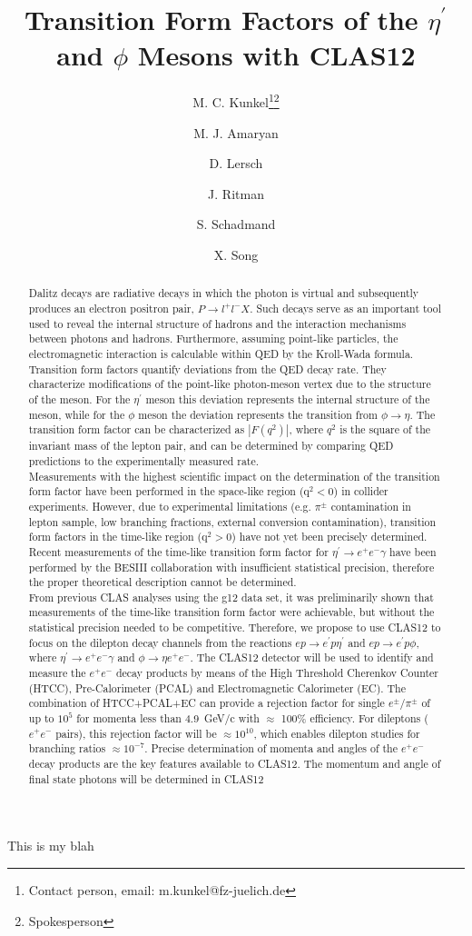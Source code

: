 \documentclass[11pt,a4paper]{article}
\title{Transition Form Factors of the $\eta^{\prime}$ and $\phi$ Mesons with CLAS12}
\date{}
\author[1]{M. C. Kunkel\thanks{Contact person, email: m.kunkel@fz-juelich.de}\thanks{Spokesperson}}
\author[2]{M. J. Amaryan}
\author[1]{D. Lersch}
\author[1]{J. Ritman\samethanks}
\author[1]{S. Schadmand\samethanks}
\author[1]{X. Song}
\affil[1]{Forschungszentrum J\"ulich, J\"ulich (Germany)}
\affil[2]{Old Dominion University (U.S.A.)}
\def\etaP{\eta^{\prime}}
\begin{document}
	\begin{titlepage}
		This is my blah
	\end{titlepage}
\maketitle
\thispagestyle{firststyle}
\begin{abstract}
Dalitz decays are radiative decays in which the photon is virtual and subsequently produces an electron positron pair, $P\rightarrow l^+l^-X$. Such decays serve as an important tool used to reveal the internal structure of hadrons and the interaction mechanisms between photons and hadrons. Furthermore, assuming point-like particles, the electromagnetic interaction is calculable within QED by the Kroll-Wada formula. Transition form factors quantify deviations from the QED decay rate. They characterize modifications of the point-like photon-meson vertex due to the structure of the meson. For the $\etaP$ meson this deviation represents the internal structure of the meson, while for the $\phi$ meson the deviation represents the transition from $\phi \to \eta$. The transition form factor can be characterized as $\left| F(q^2)\right|$, where $q^2$ is the square of the invariant mass of the lepton pair, and can be determined by comparing QED predictions to the experimentally measured rate.
\\ 
\indent Measurements with the highest scientific impact on the determination of the transition form factor have been performed in the space-like region ($\mathrm{q}^2<0$) in collider experiments. However, due to experimental limitations (e.g. $\pi^{\pm}$ contamination in lepton sample, low branching fractions, external conversion contamination), transition form factors in the time-like region ($\mathrm{q}^2>0$) have not yet been precisely determined. Recent measurements of the time-like transition form factor for $\etaP \to e^+e^- \gamma$ have been performed by the BESIII collaboration with insufficient statistical precision, therefore the proper theoretical description cannot be determined. 
\\
\indent From previous CLAS analyses using the g12 data set, it was preliminarily shown that measurements of the time-like transition form factor were achievable, but without the statistical precision needed to be competitive. Therefore, we propose to use CLAS12 to focus on the dilepton decay channels from the reactions $ep\rightarrow e^{\prime}p\etaP$ and $ep\rightarrow e^{\prime}p\phi$, where $\etaP \to e^+e^- \gamma$ and $\phi \rightarrow \eta e^+e^-$. The CLAS12 detector will be used to identify and measure the $e^+e^-$ decay products by means of the High Threshold Cherenkov Counter (HTCC), Pre-Calorimeter (PCAL) and Electromagnetic Calorimeter (EC). The combination of HTCC+PCAL+EC can provide a rejection factor for single $e^\pm/\pi^\pm$ of up to $10^5$ for momenta less than 4.9~GeV/c with $\approx$ 100\% efficiency. For dileptons ($e^+e^-$ pairs), this rejection factor will be $\approx 10^{10}$, which enables dilepton studies for branching ratios $\approx 10^{-7}$. Precise determination of momenta and angles of the $e^+e^-$ decay products are the key features available to CLAS12. The momentum and angle of final state photons will be determined in CLAS12

\end{abstract}
\end{document}
